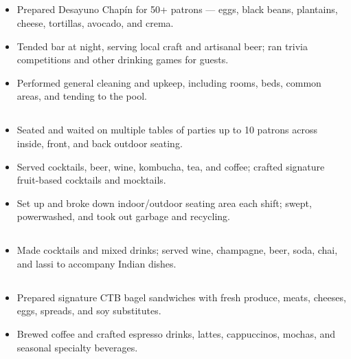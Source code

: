 \documentclass{article}
\newcommand{\subsubsectiontext}[1]{#1}
\begin{document}
\subsection{}
\subsubsectiontext{
    \begin{itemize}
        \item Prepared Desayuno Chap\'in for 50+ patrons --- eggs, black beans, plantains, cheese, tortillas, avocado, and crema.
        \item Tended bar at night, serving local craft and artisanal beer; ran trivia competitions and other drinking games for guests.
        \item Performed general cleaning and upkeep, including rooms, beds, common areas, and tending to the pool.
    \end{itemize}
}

\subsection{}
\subsubsectiontext{
    \begin{itemize}
        \item Seated and waited on multiple tables of parties up to 10 patrons across inside, front, and back outdoor seating.
        \item Served cocktails, beer, wine, kombucha, tea, and coffee; crafted signature fruit-based cocktails and mocktails.
        \item Set up and broke down indoor/outdoor seating area each shift; swept, powerwashed, and took out garbage and recycling.
    \end{itemize}
}

\subsection{}
\subsubsectiontext{
    \begin{itemize}
        \item Made cocktails and mixed drinks; served wine, champagne, beer, soda, chai, and lassi to accompany Indian dishes.
    \end{itemize}
}

\subsection{}
\subsubsectiontext{
    \begin{itemize}
        \item Prepared signature CTB bagel sandwiches with fresh produce, meats, cheeses, eggs, spreads, and soy substitutes.
        \item Brewed coffee and crafted espresso drinks, lattes, cappuccinos, mochas, and seasonal specialty beverages.
    \end{itemize}
}
\end{document}
